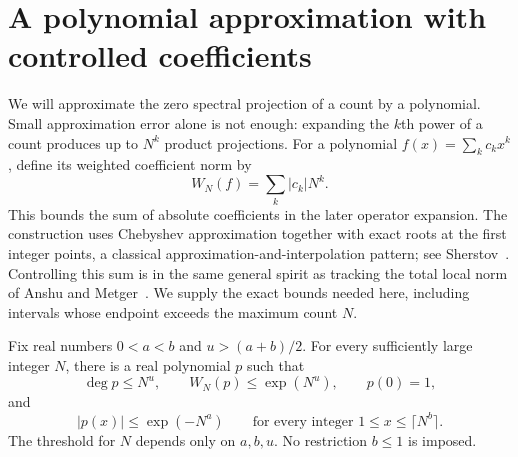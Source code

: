 \section{A polynomial approximation with controlled coefficients}
\label{sec:polynomial}

We will approximate the zero spectral projection of a count by a polynomial.
Small approximation error alone is not enough: expanding the $k$th power of a
count produces up to $N^k$ product projections. For a polynomial
$f(x)=\sum_k c_kx^k$, define its weighted coefficient norm by
\[
 W_N(f)=\sum_k|c_k|N^k.
\]
This bounds the sum of absolute coefficients in the later operator expansion.
The construction uses Chebyshev approximation together with exact roots
at the first integer points, a classical approximation-and-interpolation
pattern; see Sherstov~\cite[Section 3.1 and Lemma 3.9]{Sherstov2009}.
Controlling this sum is in the same general spirit as tracking
the total local norm of Anshu and Metger~\cite[Definition 2.3 and
Lemma 4.5]{AnshuMetger2023}. We supply the exact bounds needed here,
including intervals whose endpoint exceeds the maximum count $N$.


\begin{lemma}\label{lem:polynomial}
Fix real numbers $0<a<b$ and $u>(a+b)/2$.  For every sufficiently large integer
$N$, there is a real polynomial $p$ such that
\begin{equation}\label{eq:polynomial-bounds}
  \deg p\le N^u,
  \qquad W_N(p)\le \exp(N^u),
  \qquad p(0)=1,
\end{equation}
and
\begin{equation}\label{eq:polynomial-decay}
  |p(x)|\le \exp(-N^a)
  \qquad\text{for every integer }1\le x\le \lceil N^b\rceil.
\end{equation}
The threshold for $N$ depends only on $a,b,u$.  No restriction $b\le1$ is
imposed.
\end{lemma}

